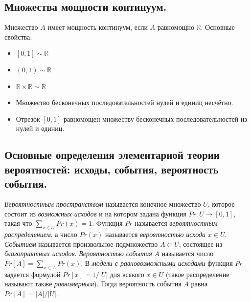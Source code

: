 \documentclass{article}
\begin{document}
\subsection{Множества мощности континуум.}
Множество $A$ имеет мощность континуум, если $A$ равномощно $\mathbb{R}$.
\newline
Основные свойства:
\begin{itemize}
    \item  $[0,1] \sim \mathbb{R}$
    \item  $(0,1) \sim \mathbb{R}$
    \item  $\mathbb{R} \times \mathbb{R} \sim \mathbb{R}$
    \item Множество бесконечных последовательностей нулей и единиц несчётно.
    \item Отрезок $[0, 1]$ равномощен множеству бесконечных последовательностей из нулей и единиц.
\end{itemize}

\subsection{Основные определения элементарной теории вероятностей: исходы, события, вероятность события.}
\textit{Вероятностным пространством} называется конечное множество $U$, которое состоит из \textit{возможных исходов} и на котором задана функция $Pr : U \to [0, 1]$, такая что $\sum_{ x \in U} Pr(x) = 1$.
\newline
\newline
Функция $Pr$ называется \textit{вероятностным распределением}, а число $Pr(x)$ называется \textit{вероятностью исхода} $x \in U$.
\newline
\newline
\textit{Событием} называется произвольное подмножество $A \subset U$, состоящее из \textit{благоприятных исходов}.
\newline
\newline
\textit{Вероятностью события} $A$ называется число $Pr[A] = \sum_{x \in A} Pr(x)$.
\newline
\newline
В \textit{модели с равновозможными исходами} функция $Pr$ задается формулой $Pr[x] = 1/|U|$ для всякого $x \in U$ (такое распределение называют также \textit{равномерным}). Тогда вероятность события $A$ равна $Pr[A] = |A|/|U|$.
\end{document}
